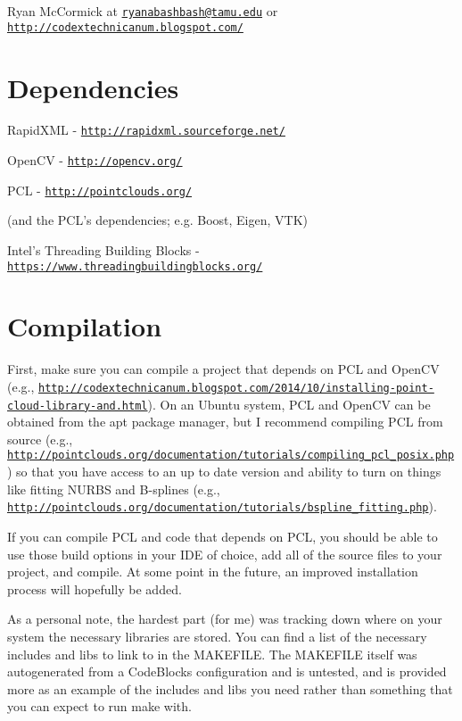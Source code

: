 Ryan Mc\-Cormick at \href{mailto:ryanabashbash@tamu.edu}{\tt ryanabashbash@tamu.\-edu} or \href{http://codextechnicanum.blogspot.com/}{\tt http\-://codextechnicanum.\-blogspot.\-com/}

\section*{Dependencies}


\begin{DoxyItemize}
\item Rapid\-X\-M\-L -\/ \href{http://rapidxml.sourceforge.net/}{\tt http\-://rapidxml.\-sourceforge.\-net/}
\item Open\-C\-V -\/ \href{http://opencv.org/}{\tt http\-://opencv.\-org/}
\item P\-C\-L -\/ \href{http://pointclouds.org/}{\tt http\-://pointclouds.\-org/}
\begin{DoxyItemize}
\item (and the P\-C\-L's dependencies; e.\-g. Boost, Eigen, V\-T\-K)
\end{DoxyItemize}
\item Intel's Threading Building Blocks -\/ \href{https://www.threadingbuildingblocks.org/}{\tt https\-://www.\-threadingbuildingblocks.\-org/}
\end{DoxyItemize}

\section*{Compilation}

First, make sure you can compile a project that depends on P\-C\-L and Open\-C\-V (e.\-g., \href{http://codextechnicanum.blogspot.com/2014/10/installing-point-cloud-library-and.html}{\tt http\-://codextechnicanum.\-blogspot.\-com/2014/10/installing-\/point-\/cloud-\/library-\/and.\-html}). On an Ubuntu system, P\-C\-L and Open\-C\-V can be obtained from the apt package manager, but I recommend compiling P\-C\-L from source (e.\-g., \href{http://pointclouds.org/documentation/tutorials/compiling_pcl_posix.php}{\tt http\-://pointclouds.\-org/documentation/tutorials/compiling\-\_\-pcl\-\_\-posix.\-php}) so that you have access to an up to date version and ability to turn on things like fitting N\-U\-R\-B\-S and B-\/splines (e.\-g., \href{http://pointclouds.org/documentation/tutorials/bspline_fitting.php}{\tt http\-://pointclouds.\-org/documentation/tutorials/bspline\-\_\-fitting.\-php}).

If you can compile P\-C\-L and code that depends on P\-C\-L, you should be able to use those build options in your I\-D\-E of choice, add all of the source files to your project, and compile. At some point in the future, an improved installation process will hopefully be added.

As a personal note, the hardest part (for me) was tracking down where on your system the necessary libraries are stored. You can find a list of the necessary includes and libs to link to in the M\-A\-K\-E\-F\-I\-L\-E. The M\-A\-K\-E\-F\-I\-L\-E itself was autogenerated from a Code\-Blocks configuration and is untested, and is provided more as an example of the includes and libs you need rather than something that you can expect to run make with. 